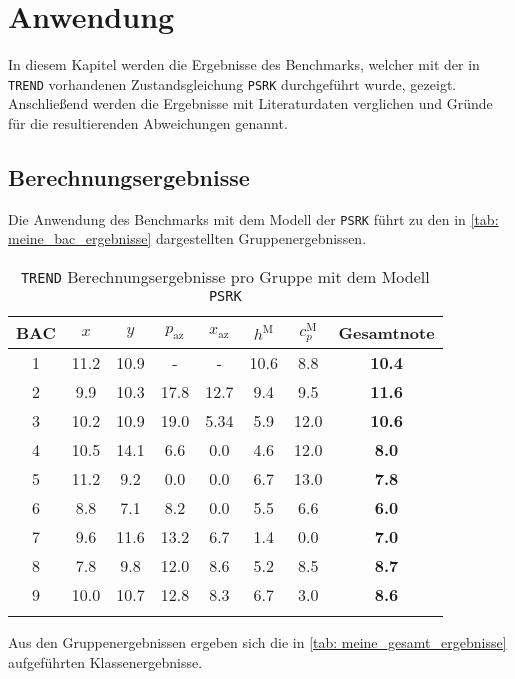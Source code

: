 \documentclass[../thesis.tex]{subfiles}
\begin{document}
\chapter{Anwendung}

In diesem Kapitel werden die Ergebnisse des Benchmarks, welcher mit der in \texttt{TREND} vorhandenen Zustandsgleichung \texttt{PSRK} durchgeführt wurde, gezeigt. Anschließend werden die Ergebnisse mit Literaturdaten verglichen und Gründe für die resultierenden Abweichungen genannt.

\section{Berechnungsergebnisse}

Die Anwendung des Benchmarks mit dem Modell der \texttt{PSRK} führt zu den in \autoref{tab: meine_bac_ergebnisse} dargestellten Gruppenergebnissen.

\begin{table} [htb]
	\centering
	\caption{\texttt{TREND} Berechnungsergebnisse pro Gruppe mit dem Modell \texttt{PSRK}}
	\begin{tabular}{ cccccccc }
		\hline
		BAC & $ x $ & $ y $ & $ p_\mathrm{az}$ & $ x_\mathrm{az}$ & $ h^\mathrm{M} $ & $ c_p^\mathrm{M} $ & \textbf{Gesamtnote} \\
		\hline
		1 & 11.2  & 10.9 & -     & -     & 10.6 & 8.8  & \textbf{10.4}\\
		2 & 9.9   & 10.3 & 17.8  & 12.7 & 9.4  & 9.5  & \textbf{11.6}\\
		3 & 10.2  & 10.9 & 19.0  & 5.34 & 5.9  & 12.0 & \textbf{10.6}\\
		4 & 10.5  & 14.1 & 6.6   & 0.0   & 4.6  & 12.0  & \textbf{8.0}\\
		5 & 11.2  & 9.2  & 0.0   & 0.0   & 6.7  & 13.0 & \textbf{7.8}\\
		6 & 8.8   & 7.1  & 8.2   & 0.0  & 5.5  & 6.6  & \textbf{6.0}\\
		7 & 9.6   & 11.6 & 13.2  & 6.7  & 1.4  & 0.0   & \textbf{7.0}\\
		8 & 7.8  & 9.8  & 12.0  & 8.6  & 5.2  & 8.5  & \textbf{8.7}\\
		9 & 10.0  & 10.7 & 12.8 & 8.3  & 6.7  & 3.0  & \textbf{8.6}\\
		\hline
		\label{tab: meine_bac_ergebnisse}
	\end{tabular}
\end{table}


Aus den Gruppenergebnissen ergeben sich die in \autoref{tab: meine_gesamt_ergebnisse} aufgeführten Klassenergebnisse.
\end{document}
